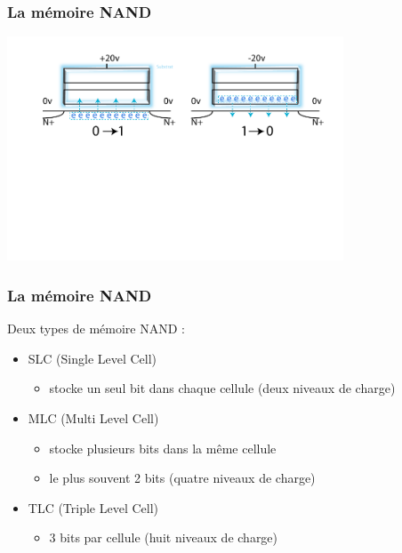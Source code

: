 \begin{frame}
\frametitle{La mémoire NAND}
\begin{center}
\includegraphics[width=10cm]{../illustration/NAND_modif.pdf}
\end{center}
\end{frame}


\begin{frame}
\frametitle{La mémoire NAND}
Deux types de mémoire NAND :
\begin{itemize}
\item SLC (Single Level Cell)
\begin{itemize}
\item stocke un seul bit dans chaque cellule (deux niveaux de charge)
\end{itemize}
\item MLC (Multi Level Cell)
\begin{itemize}
\item stocke plusieurs bits dans la même cellule
\item le plus souvent 2 bits (quatre niveaux de charge)
\end{itemize}
\item TLC (Triple Level Cell)
\begin{itemize}
\item 3 bits par cellule (huit niveaux de charge)
\end{itemize}
\end{itemize}
\end{frame}

